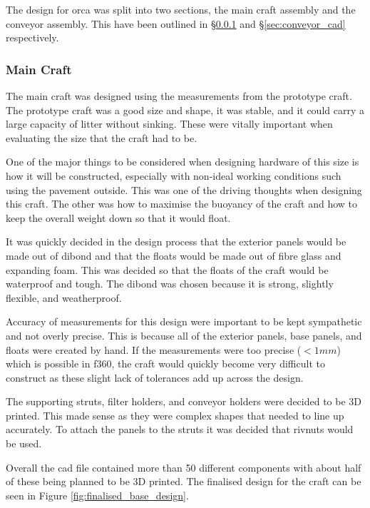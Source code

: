 \documentclass [11pt]{article}
\begin{document}
The design for \gls{orca} was split into two sections, the main craft assembly and the conveyor assembly. This have been outlined in §\ref{sec:main_craft_cad} and §\ref{sec:conveyor_cad} respectively.

\subsubsection{Main Craft}\label{sec:main_craft_cad}

The main craft was designed using the measurements from the prototype craft. The prototype craft was a good size and shape, it was stable, and it could carry a large capacity of litter without sinking. These were vitally important when evaluating the size that the craft had to be. 

One of the major things to be considered when designing hardware of this size is how it will be constructed, especially with non-ideal working conditions such using the pavement outside.  This was one of the driving thoughts when designing this craft. The other was how to maximise the buoyancy of the craft and how to keep the overall weight down so that it would float. 

It was quickly decided in the design process that the exterior panels would be made out of \gls{dibond} and that the floats would be made out of fibre glass and expanding foam. This was decided so that the floats of the craft would be waterproof and tough. The \gls{dibond} was chosen because it is strong, slightly flexible, and weatherproof. 

Accuracy of measurements for this design were important to be kept sympathetic and not overly precise. This is because all of the exterior panels, base panels, and floats were created by hand. If the measurements were too precise ($<1mm$) which is possible in \gls{f360}, the craft would quickly become very difficult to construct as these slight lack of tolerances add up across the design.

The supporting struts, filter holders, and conveyor holders were decided to be 3D printed. This made sense as they were complex shapes that needed to line up accurately. To attach the panels to the struts it was decided that \gls{rivnut}s would be used. 

Overall the \gls{cad} file contained more than 50 different components with about half of these being planned to be 3D printed. The finalised design for the craft can be seen in Figure \ref{fig:finalised_base_design}. 
\end{document}
